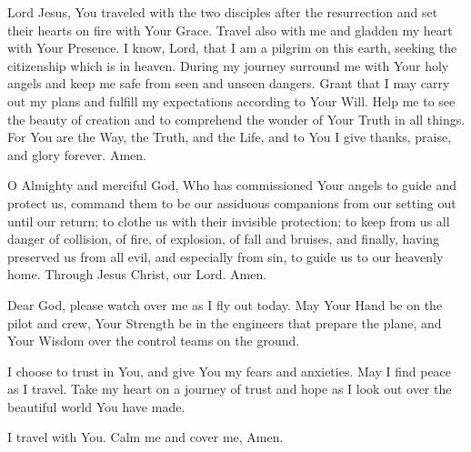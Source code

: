 Lord Jesus, You traveled with the two disciples after the resurrection and set their hearts on fire with Your Grace.
Travel also with me and gladden my heart with Your Presence.
I know, Lord, that I am a pilgrim on this earth, seeking the citizenship which is in heaven.
During my journey surround me with Your holy angels and keep me safe from seen and unseen dangers.
Grant that I may carry out my plans and fulfill my expectations according to Your Will.
Help me to see the beauty of creation and to comprehend the wonder of Your Truth in all things.
For You are the Way, the Truth, and the Life, and to You I give thanks, praise, and glory forever.
Amen.

\label{prayer:travelers}
O Almighty and merciful God, Who has commissioned Your angels to guide and protect us, command them to be our assiduous companions from our setting out until our return;
to clothe us with their invisible protection;
to keep from us all danger of collision, of fire, of explosion, of fall and bruises, and finally, having preserved us from all evil, and especially from sin, to guide us to our heavenly home.
Through Jesus Christ, our Lord. Amen.

Dear God, please watch over me as I fly out today.
May Your Hand be on the pilot and crew, Your Strength be in the engineers that prepare the plane, and Your Wisdom over the control teams on the ground.

I choose to trust in You, and give You my fears and anxieties.
May I find peace as I travel.
Take my heart on a journey of trust and hope as I look out over the beautiful world You have made.

I travel with You.
Calm me and cover me,
Amen.